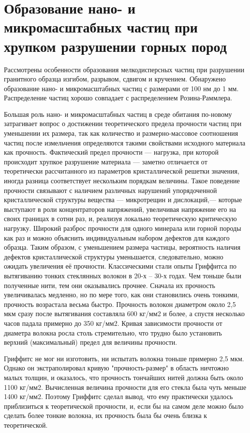 \chapter{Образование нано- и микромасштабных частиц при хрупком разрушении горных пород} \label{chapt3}

Рассмотрены особенности образования мелкодисперсных частиц при разрушении гранитного образца изгибом, разрывом, сдвигом и кручением. Обнаружено образование нано- и микромасштабных частиц с размерами от 100 нм до 1 мм. Распределение частиц хорошо совпадает с распределением Розина-Раммлера.

Большая роль нано- и микромасштабных частиц в среде обитания по-новому затрагивает вопрос о достижении теоретического предела прочности частиц при уменьшении их размера, так как количество и размерно-массовое соотношения частиц после измельчения определяются такими свойствами исходного материала как прочность. Фактический предел прочности — нагрузка, при которой происходит хрупкое разрушение материала — заметно отличается от теоретически рассчитанного из параметров кристаллической решетки значения, иногда разница соответствует нескольким порядкам величины. Такое поведение прочности связывают с наличием различных нарушений упорядоченной кристаллической структуры вещества —  микротрещин и дислокаций,— которые выступают в роли концентраторов напряжений, увеличивая напряжение его на своих границах в сотни раз, и, реализуя локально теоретическую критическую нагрузку. Широкий разброс прочности для одного минерала или горной породы как раз и можно объяснить индивидуальным набором дефектов для каждого образца.
Таким образом, с уменьшением размера частицы, вероятность наличия дефектов кристаллической структуры уменьшается, следовательно, можно ожидать увеличения её прочности. 
Классическими стали опыты Гриффитса по вытягиванию тонких стеклянных волокон в 20-х – 30-х годах. Чем тоньше были полученные нити, тем они оказывались прочнее. Сначала их прочность увеличивалась медленно, но по мере того, как они становились очень тонкими, прочность возрастала весьма быстро. Прочность волокон диаметром около 2,5 мкм сразу после вытягивания составляла 600 кг/мм2 и более, а спустя несколько часов падала примерно до 350 кг/мм2. Кривая зависимости прочности от диаметра волокна росла столь стремительно, что трудно было установить верхний (максимальный) предел для величины прочности.

Гриффитс не мог ни изготовить, ни испытать волокна тоньше примерно 2,5 мкм. Однако он экстраполировал кривую "прочность-размер" в область ничтожно малых толщин, и оказалось, что прочность тончайших нитей должна быть около 1100 кг/мм2. Вычисленная величина прочности для его стекла была чуть меньше 1400 кг/мм2. Поэтому Гриффитс сделал вывод, что ему практически удалось приблизиться к теоретической прочности, и, если бы на самом деле можно было сделать более тонкие волокна, их прочность была бы очень близка к теоретической.

